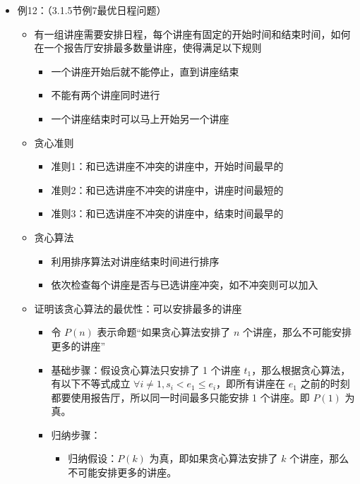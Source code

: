 \documentclass[UTF8]{report}
\theoremstyle{MyLineTheoremStyle} %
\theoremstyle{MyBlockTheoremStyle} %
\theoremstyle{MySubsubsectionStyle} %
\begin{document}
\begin{itemize}
    \item 例12：（3.1.5节例7最优日程问题）
    \begin{itemize}
        \item 有一组讲座需要安排日程，每个讲座有固定的开始时间和结束时间，如何在一个报告厅安排最多数量讲座，使得满足以下规则
        \begin{itemize}
            \item 一个讲座开始后就不能停止，直到讲座结束
            \item 不能有两个讲座同时进行
            \item 一个讲座结束时可以马上开始另一个讲座
        \end{itemize}
        \item 贪心准则
        \begin{itemize}
            \item 准则1：和已选讲座不冲突的讲座中，开始时间最早的
            \item 准则2：和已选讲座不冲突的讲座中，讲座时间最短的
            \item 准则3：和已选讲座不冲突的讲座中，结束时间最早的
        \end{itemize}
        \item 贪心算法
        \begin{itemize}
            \item 利用排序算法对讲座结束时间进行排序
            \item 依次检查每个讲座是否与已选讲座冲突，如不冲突则可以加入
                    \end{itemize}
                    \item 证明该贪心算法的最优性：可以安排最多的讲座
                    \begin{itemize}
                        \item 令 $P(n)$ 表示命题“如果贪心算法安排了 $n$ 个讲座，那么不可能安排更多的讲座”
                        \item 基础步骤：假设贪心算法只安排了 1 个讲座 $t_1$，那么根据贪心算法，有以下不等式成立 $\forall i \neq 1, s_i < e_1 \leq e_i$，即所有讲座在 $e_1$ 之前的时刻都要使用报告厅，所以同一时间最多只能安排 1 个讲座。即 $P(1)$ 为真。
                        \item 归纳步骤：
                        \begin{itemize}
                            \item 归纳假设：$P(k)$ 为真，即如果贪心算法安排了 $k$ 个讲座，那么不可能安排更多的讲座。

\end{itemize}
\end{itemize}
\end{itemize}
\end{itemize}
\end{document}
